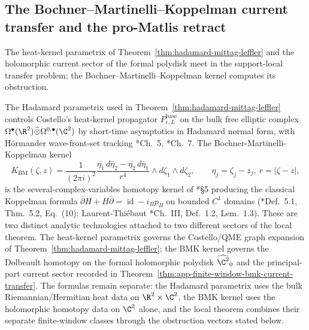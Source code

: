 \subsection{The Bochner--Martinelli--Koppelman current transfer and the pro-Matlis retract}\label{ssec:bmk-promatlis-transfer}

The heat-kernel parametrix of Theorem~\ref{thm:hadamard-mittag-leffler}
and the holomorphic current sector of the formal polydisk meet in the
support-local transfer problem; the Bochner--Martinelli--Koppelman
kernel computes its obstruction.

\begin{rmk}\label{rmk:hadamard-vs-bmk}
  The Hadamard parametrix used in
  Theorem~\ref{thm:hadamard-mittag-leffler} controls Costello's
  heat-kernel propagator \(P_{\epsilon,L}^{\mathrm{base}}\) on the bulk
  free elliptic complex
  \(\Omega^\bullet(\R^2)\widehat\otimes\Omega^{0,\bullet}(\C^2)\) by
  short-time asymptotics in Hadamard normal form, with Hörmander
  wave-front-set tracking
  \cite{costello-renormalization}*{Ch.~5},
  \cite{hormander-vol1}*{Ch.~7}.  The Bochner-Martinelli-Koppelman
  kernel
  \[
    K_{\mathrm{BM}}(\zeta,z)
      =
    \frac{1}{(2\pi i)^2}
    \frac{
      \overline{\eta_1}\,d\bar\eta_2-\overline{\eta_2}\,d\bar\eta_1
    }{r^4}
    \wedge d\zeta_1\wedge d\zeta_2,
    \qquad
    \eta_j=\zeta_j-z_j,\ r=|\zeta-z|,
  \]
  is the several-complex-variables homotopy kernel of
  \cite{ruppenthal-bmk}*{\S5} producing the classical Koppelman
  formula
  \(\bar\partial H+H\bar\partial=\operatorname{id}-i_Bp_B\) on bounded
  \(C^1\) domains
  (\cite{ruppenthal-bmk}*{Def.~5.1, Thm.~5.2, Eq.~(10)};
  Laurent-Thiébaut \cite{laurent-thiebaut-bmk}*{Ch.~III, Def.~1.2,
  Lem.~1.3}).  These are two distinct analytic technologies attached
  to two different sectors of the local theorem.  The heat-kernel
  parametrix governs the Costello/QME graph expansion of
  Theorem~\ref{thm:hadamard-mittag-leffler}; the BMK kernel governs the
  Dolbeault homotopy on the formal holomorphic polydisk
  \(\widehat{\C^2}_0\) and the principal-part current sector recorded in
  Theorem~\ref{thm:app-finite-window-bmk-current-transfer}.  The formulas
  remain separate: the Hadamard parametrix uses the bulk
  Riemannian/Hermitian heat data on \(\R^2\times\C^2\), the BMK kernel
  uses the holomorphic homotopy data on \(\C^2\) alone, and the local
  theorem combines their separate finite-window classes through the
  obstruction vectors stated below.
\end{rmk}

